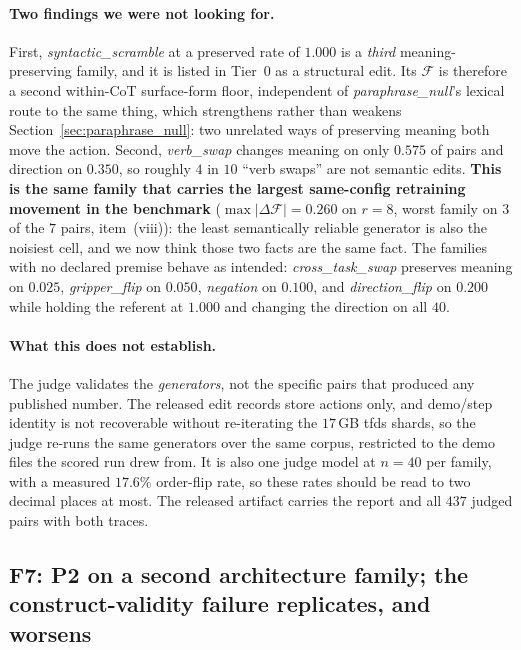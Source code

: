 \documentclass{article}
\begin{document}
\paragraph{Two findings we were not looking for.} First, \emph{syntactic\_scramble} at a preserved rate of $1.000$ is a \emph{third} meaning-preserving family, and it is listed in Tier~0 as a structural edit. Its $\mathcal{F}$ is therefore a second within-CoT surface-form floor, independent of \emph{paraphrase\_null}'s lexical route to the same thing, which strengthens rather than weakens Section~\ref{sec:paraphrase_null}: two unrelated ways of preserving meaning both move the action. Second, \emph{verb\_swap} changes meaning on only $0.575$ of pairs and direction on $0.350$, so roughly $4$ in $10$ ``verb swaps'' are not semantic edits. \textbf{This is the same family that carries the largest same-config retraining movement in the benchmark} ($\max|\Delta\mathcal{F}| = 0.260$ on $r{=}8$, worst family on $3$ of the $7$ pairs, item~(viii)): the least semantically reliable generator is also the noisiest cell, and we now think those two facts are the same fact. The families with no declared premise behave as intended: \emph{cross\_task\_swap} preserves meaning on $0.025$, \emph{gripper\_flip} on $0.050$, \emph{negation} on $0.100$, and \emph{direction\_flip} on $0.200$ while holding the referent at $1.000$ and changing the direction on all $40$.

\paragraph{What this does not establish.} The judge validates the \emph{generators}, not the specific pairs that produced any published number. The released edit records store actions only, and demo/step identity is not recoverable without re-iterating the $17$\,GB tfds shards, so the judge re-runs the same generators over the same corpus, restricted to the demo files the scored run drew from. It is also one judge model at $n{=}40$ per family, with a measured $17.6\%$ order-flip rate, so these rates should be read to two decimal places at most. The released artifact carries the report and all $437$ judged pairs with both traces.

\subsection{F7: P2 on a second architecture family; the construct-validity failure replicates, and worsens}
\label{sec:cross_family}
\end{document}
